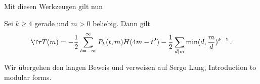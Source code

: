 Mit diesen Werkzeugen gilt nun
\begin{theorem}
	Sei $k \geq 4$ gerade und $m > 0$ beliebig. Dann gilt
	\[
		\Tr T(m) = -\frac{1}{2} \sum_{t=-\infty}^\infty P_k(t,m) H(4m-t^2) - \frac{1}{2} \sum_{d|m} \min(d, \frac{m}{d})^{k-1}\,.
	\]
\end{theorem}

\begin{bewe}
	Wir übergehen den langen Beweis und verweisen auf Sergo Lang, Introduction to modular forms.
\end{bewe}